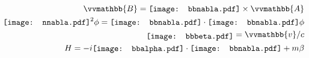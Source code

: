 \documentclass[paper=a4, fontsize=12pt, line_length=16cm, number_of_lines=33,dvipdfmx]{jlreq}
\newcommand{\Ab}{{\vvmathbb{A}}}
\newcommand{\Bb}{{\vvmathbb{B}}}
\newcommand{\bbnabla}{\raisebox{-0.05ex}{\texttt{[image: bbnabla.pdf]}}}
\newcommand{\nnabla}{\raisebox{-0.05ex}{\texttt{[image: nnabla.pdf]}}}
\newcommand{\bbbeta}{\raisebox{-0.5ex}{\texttt{[image: bbbeta.pdf]}}}
\newcommand{\bbalpha}{\raisebox{-0.1ex}{\texttt{[image: bbalpha.pdf]}}}
\begin{document}
\begin{align}
  \Bb = \bbnabla \times \Ab\\
  \nnabla^2 \phi = \bbnabla\cdot \bbnabla \phi \\
  \bbbeta= \vvmathbb{v}/c\\
  H=-i\bbalpha\cdot \bbnabla + m\beta
\end{align}
\end{document}
